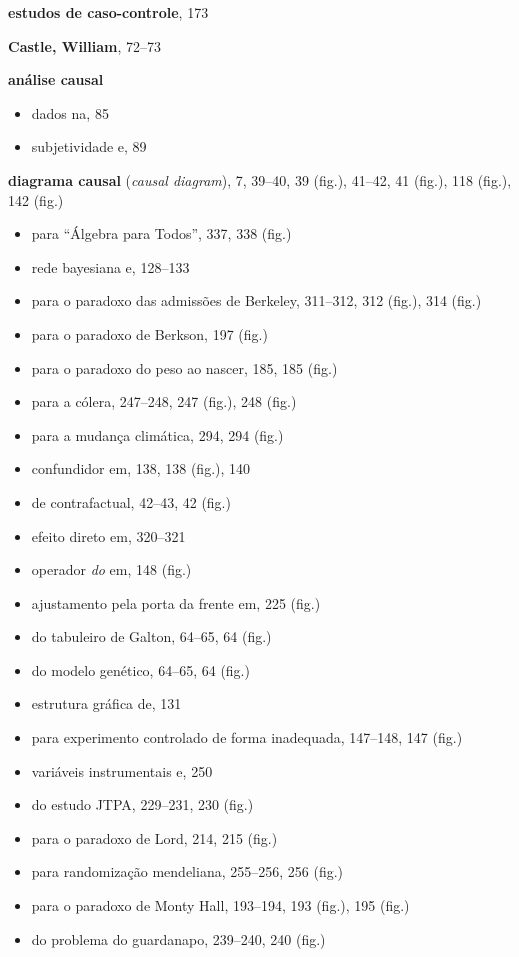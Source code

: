 \documentclass[11pt,a5paper,twoside]{book}
\begin{document}
\textbf{estudos de caso-controle}, 173

\textbf{Castle, William}, 72–73

\textbf{análise causal}

\begin{itemize}
\item dados na, 85
\item subjetividade e, 89
\end{itemize}
\textbf{diagrama causal} (\textit{causal diagram}), 7, 39–40, 39 (fig.), 41–42, 41 (fig.), 118 (fig.), 142 (fig.)

\begin{itemize}
\item para “Álgebra para Todos”, 337, 338 (fig.)
\item rede bayesiana e, 128–133
\item para o paradoxo das admissões de Berkeley, 311–312, 312 (fig.), 314 (fig.)
\item para o paradoxo de Berkson, 197 (fig.)
\item para o paradoxo do peso ao nascer, 185, 185 (fig.)
\item para a cólera, 247–248, 247 (fig.), 248 (fig.)
\item para a mudança climática, 294, 294 (fig.)
\item confundidor em, 138, 138 (fig.), 140
\item de contrafactual, 42–43, 42 (fig.)
\item efeito direto em, 320–321
\item operador \textit{do} em, 148 (fig.)
\item ajustamento pela porta da frente em, 225 (fig.)
\item do tabuleiro de Galton, 64–65, 64 (fig.)
\item do modelo genético, 64–65, 64 (fig.)
\item estrutura gráfica de, 131
\item para experimento controlado de forma inadequada, 147–148, 147 (fig.)
\item variáveis instrumentais e, 250
\item do estudo JTPA, 229–231, 230 (fig.)
\item para o paradoxo de Lord, 214, 215 (fig.)
\item para randomização mendeliana, 255–256, 256 (fig.)
\item para o paradoxo de Monty Hall, 193–194, 193 (fig.), 195 (fig.)
\item do problema do guardanapo, 239–240, 240 (fig.)

\end{itemize}
\end{document}
